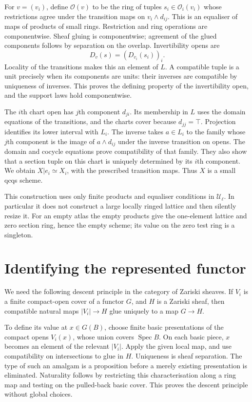 \documentclass[11pt]{amsart}
\theoremstyle{definition}\newtheorem{definition}[theorem]{Definition}
\theoremstyle{remark}\newtheorem{remark}[theorem]{Remark}
\newcommand{\UU}{\mathcal U}
\newcommand{\Spec}{\operatorname{Spec}}
\begin{document}
For $v=(v_i)$, define $\mathcal O(v)$ to be the ring of tuples
$s_i\in\mathcal O_i(v_i)$ whose restrictions agree under the transition
maps on $v_i\wedge d_{ij}$. This is an equaliser of maps of products
of small rings. Restriction and ring operations are componentwise.
Sheaf gluing is componentwise; agreement of the glued components follows
by separation on the overlap. Invertibility opens are
\[
 D_v(s)=(D_{v_i}(s_i))_i.
\]
Locality of the transitions makes this an element of $L$. A compatible
tuple is a unit precisely when its components are units: their inverses
are compatible by uniqueness of inverses. This proves the defining
property of the invertibility open, and the support laws hold
componentwise.

The $i$th chart open has $j$th component $d_{ji}$. Its membership in $L$
uses the domain equations of the transitions, and the charts cover
because $d_{jj}=\top$. Projection identifies its lower interval with
$L_i$. The inverse takes $a\in L_i$ to the family whose $j$th component
is the image of $a\wedge d_{ij}$ under the inverse transition on opens.
The domain and cocycle equations prove compatibility of that family.
They also show that a section tuple on this chart is uniquely determined
by its $i$th component. We obtain $X|e_i\simeq X_i$, with the prescribed
transition maps. Thus $X$ is a small qcqs scheme.

This construction uses only finite products and equaliser conditions in
$\UU_\ell$. In particular it does not construct a large locally ringed
lattice and then silently resize it. For an empty atlas the empty
products give the one-element lattice and zero section ring, hence the
empty scheme; its value on the zero test ring is a singleton.

\section{Identifying the represented functor}
We need the following descent principle in the category of Zariski
sheaves. If $V_i$ is a finite compact-open cover of a functor $G$, and
$H$ is a Zariski sheaf, then compatible natural maps $|V_i|\to H$ glue
uniquely to a map $G\to H$.

To define its value at $x\in G(B)$, choose finite basic presentations
of the compact opens $V_i(x)$, whose union covers $\Spec B$. On each
basic piece, $x$ becomes an element of the relevant $|V_i|$.
Apply the given local map, and use compatibility on intersections to
glue in $H$. Uniqueness is sheaf separation. The type of such an amalgam
is a proposition before a merely existing presentation is eliminated.
Naturality follows by restricting this characterisation along a ring
map and testing on the pulled-back basic cover. This proves the descent
principle without global choices.
\end{document}
